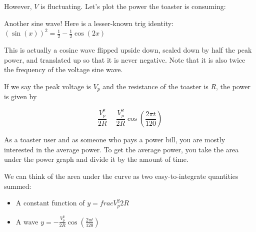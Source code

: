 However, $V$ is fluctuating. Let's plot the power the toaster is consuming:


Another sine wave! Here is a lesser-known trig identity: $\left( \sin(x) \right)^2 = \frac{1}{2} - \frac{1}{2}\cos(2x)$

This is actually a cosine wave flipped upside down, scaled down by
half the peak power, and translated up so that it is never
negative. Note that it is also twice the frequency of the voltage sine
wave.

If we say the peak voltage is $V_p$ and the resistance of the toaster
is $R$, the power is given by

$$\frac{V_p^2}{2R} - \frac{V_p^2}{2R} \cos \left(\frac{2\pi t}{120} \right)$$

As a toaster user and as someone who pays a power bill, you are mostly
interested in the average power.  To get the average power, you take
the area under the power graph and divide it by the amount of time.

We can think of the area under the curve as two easy-to-integrate quantities summed:
\begin{itemize}
\item A constant function of $y = frac{V_p^2}{2R}$
\item A wave $y = - \frac{V_p^2}{2R} \cos \left(\frac{2\pi t}{120} \right)$
\end{itemize}

